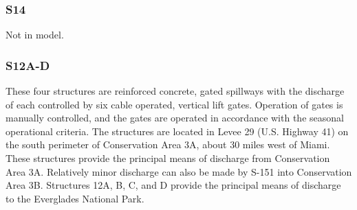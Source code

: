 \clearpage
\subsubsection{S14}
Not in model.

\clearpage
\subsubsection{S12A-D}

These four structures are reinforced concrete, gated spillways with the discharge of each controlled by six cable operated, vertical lift gates. Operation of gates is manually controlled, and the gates are operated in accordance with the seasonal operational criteria. The structures are located in Levee 29 (U.S. Highway 41) on the south perimeter of Conservation Area 3A, about 30 miles west of Miami. These structures provide the principal means of discharge from Conservation Area 3A. Relatively minor discharge can also be made by S-151 into Conservation Area 3B. Structures 12A, B, C, and D provide the principal means of discharge to the Everglades National Park.


%
%

